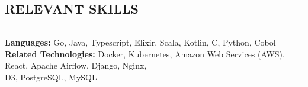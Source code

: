 \documentclass{res}
\begin{document}
\begin{resume}
		\section{{RELEVANT SKILLS}}
    \noindent\rule[0.5ex]{\linewidth}{1pt}
			{\bf Languages:} Go, Java, Typescript, Elixir, Scala, Kotlin, C, Python, Cobol\\
			{\bf Related Technologies:} Docker, Kubernetes, Amazon Web Services (AWS), React, Apache Airflow, Django, Nginx,\ \\ D3, PostgreSQL, MySQL

	\end{resume}
\end{document}
